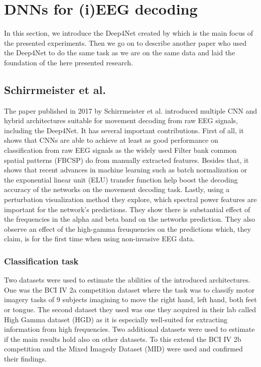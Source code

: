 \section{DNNs for (i)EEG decoding}
\label{sec:dnn-decoding}
In this section, we introduce the Deep4Net created by \cite{schirrmeister-deep-2017} which is the main focus of the presented experiments.
Then we go on to describe another paper \cite{Hammer-2021} who used the Deep4Net to do the same task as we are on the same data and laid the foundation of the here presented research.

\subsection{Schirrmeister et al.}\label{subsec:schirrmeister-et-al}
The paper \cite{schirrmeister-deep-2017} published in 2017 by Schirrmeister et al. introduced multiple CNN and hybrid architectures suitable for movement decoding from raw EEG signals, including the Deep4Net.
It has several important contributions.
First of all, it shows that CNNs are able to achieve at least as good performance on classification from raw EEG signals as the widely used Filter bank common spatial patterns (FBCSP) do from manually extracted features. Besides that, it shows that recent advances in machine learning such as batch normalization or the exponential linear unit (ELU) transfer function help boost the decoding accuracy of the networks on the movement decoding task.
Lastly, using a perturbation visualization method they explore, which spectral power features are important for the network's predictions.
They show there is substantial effect of the frequencies in the alpha and beta band on the networks prediction.
They also observe an effect of the high-gamma freuquencies on the predictions which, they claim, is for the first time when using non-invasive EEG data.\\

\subsubsection{Classification task}
Two datasets were used to estimate the abilities of the introduced architectures.
One was the BCI IV 2a competition dataset \cite{brunner2008bci} where the task was to classify motor imagery tasks of 9 subjects imagining to move the right hand, left hand, both feet or tongue.
The second dataset they used was one they acquired in their lab called High Gamma dataset (HGD) as it is especially well-suited for extracting information from high frequencies.
Two additional datasets were used to estimate if the main results hold also on other datasets. 
To this extend the BCI IV 2b competition and the Mixed Imagedy Dataset (MID) were used and confirmed their findings.


